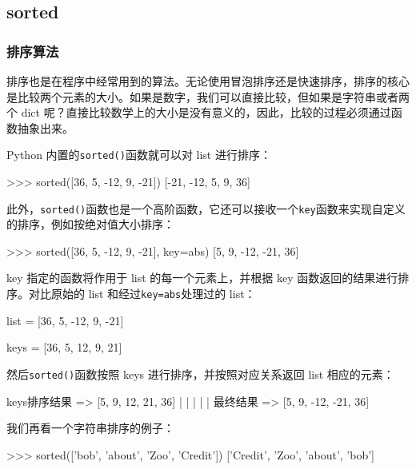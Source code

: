 \hypertarget{sorted}{%
\subsection{sorted}\label{sorted}}

\hypertarget{ux6392ux5e8fux7b97ux6cd5}{%
\subsubsection{排序算法}\label{ux6392ux5e8fux7b97ux6cd5}}

排序也是在程序中经常用到的算法。无论使用冒泡排序还是快速排序，排序的核心是比较两个元素的大小。如果是数字，我们可以直接比较，但如果是字符串或者两个
dict
呢？直接比较数学上的大小是没有意义的，因此，比较的过程必须通过函数抽象出来。

Python 内置的\texttt{sorted()}函数就可以对 list 进行排序：

\begin{pythoncode}
>>> sorted([36, 5, -12, 9, -21])
[-21, -12, 5, 9, 36]
\end{pythoncode}

此外，\texttt{sorted()}函数也是一个高阶函数，它还可以接收一个\texttt{key}函数来实现自定义的排序，例如按绝对值大小排序：

\begin{pythoncode}
>>> sorted([36, 5, -12, 9, -21], key=abs)
[5, 9, -12, -21, 36]
\end{pythoncode}

key 指定的函数将作用于 list 的每一个元素上，并根据 key
函数返回的结果进行排序。对比原始的 list 和经过\texttt{key=abs}处理过的
list：

\begin{pythoncode}
list = [36, 5, -12, 9, -21]

keys = [36, 5,  12, 9,  21]
\end{pythoncode}

然后\texttt{sorted()}函数按照 keys 进行排序，并按照对应关系返回 list
相应的元素：

\begin{pythoncode}
keys排序结果 => [5, 9,  12,  21, 36]
                |  |    |    |   |
最终结果     => [5, 9, -12, -21, 36]
\end{pythoncode}

我们再看一个字符串排序的例子：

\begin{pythoncode}
>>> sorted(['bob', 'about', 'Zoo', 'Credit'])
['Credit', 'Zoo', 'about', 'bob']
\end{pythoncode}

